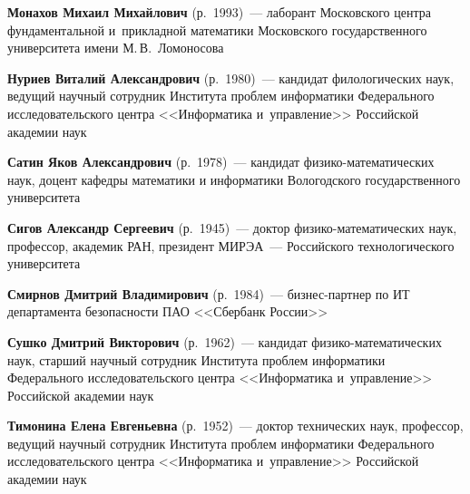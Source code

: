 \begin{multicols}{2}
\vspace*{3pt}

\noindent
\textbf{Монахов Михаил Михайлович} (р.\ 1993)~--- 
лаборант Московского центра фундаментальной и~прикладной математики Московского государственного 
университета имени М.\,В.~Ломоносова


\vspace*{3pt}

\noindent
\textbf{Нуриев Виталий Александрович} (р.\ 1980)~--- 
кандидат филологических наук, ведущий научный сотруд\-ник Института проб\-лем 
информатики Федерального исследовательского цент\-ра <<Информатика и~управ\-ле\-ние>>
 Российской академии наук

\vspace*{3pt}

\noindent
\textbf{Сатин Яков Александрович}  (р.\ 1978)~--- кандидат фи\-зи\-ко-ма\-те\-ма\-ти\-че\-ских наук, 
доцент кафедры математики и информатики Вологодского государственного университета

\columnbreak 

\noindent
\textbf{Сигов Александр Сергеевич} (р.\ 1945)~--- 
доктор фи\-зи\-ко-ма\-те\-ма\-ти\-че\-ских наук, профессор,
академик РАН, %
президент МИРЭА~--- Российского технологического университета

 \vspace*{3pt}
 
 \noindent
\textbf{Смирнов Дмитрий Владимирович} (р.\ 1984)~--- биз\-нес-парт\-нер по ИТ 
департамента безопасности ПАО <<Сбербанк России>>

\vspace*{3pt}

\noindent
\textbf{Сушко Дмитрий Викторович} (р.\ 1962)~--- 
кандидат фи\-зи\-ко-ма\-те\-ма\-ти\-че\-ских наук, 
старший научный со\-труд\-ник Института проб\-лем информатики Федерального исследовательского цент\-ра 
<<Информатика и~управ\-ле\-ние>> Российской академии наук

\vspace*{3pt}



\noindent
\textbf{Тимонина Елена Евгеньевна} (р.\ 1952)~--- 
доктор технических наук, профессор, ведущий научный сотруд\-ник Института проб\-лем 
информатики Федерального исследовательского цент\-ра <<Информатика и~управ\-ле\-ние>> Российской академии наук

\vspace*{3pt}


\end{multicols}

